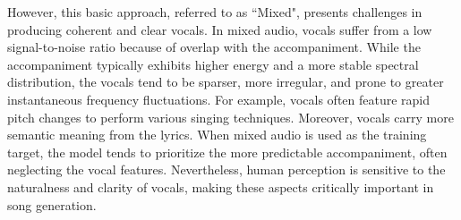 However, this basic approach, referred to as ``Mixed", presents challenges in producing coherent and clear vocals. 
In mixed audio, vocals suffer from a low signal-to-noise ratio because of overlap with the accompaniment. While the accompaniment typically exhibits higher energy and a more stable spectral distribution, the vocals tend to be sparser, more irregular, and prone to greater instantaneous frequency fluctuations. For example, vocals often feature rapid pitch changes to perform various singing techniques. Moreover, vocals carry more semantic meaning from the lyrics. When mixed audio is used as the training target, the model tends to prioritize the more predictable accompaniment, often neglecting the vocal features. Nevertheless, human perception is sensitive to the naturalness and clarity of vocals, making these aspects critically important in song generation.
% 

